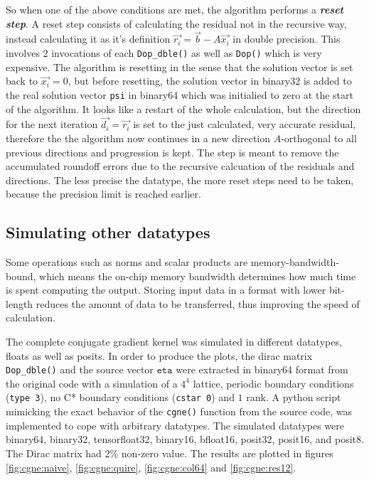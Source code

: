 \documentclass{article}
\theoremstyle{plain} %
\theoremstyle{remark} %
\def\code#1{\texttt{#1}}
\def\df#1{\textbf{\textit{#1}}}
\numberwithin{equation}{section}
\begin{document}
So when one of the above conditions are met, the algorithm performs a \df{reset step}. A reset step consists of calculating the residual not in the recursive way, instead calculating it as it's definition $\vec{r_i} = \vec{b} - A \vec{x_i}$ in double precision. This involves \num{2} invocations of each \code{Dop\_dble()} as well as \code{Dop()} which is very expensive. The algorithm is resetting in the sense that the solution vector is set back to $\vec{x_i} = 0$, but before resetting, the solution vector in \gls{binary32} is added to the real solution vector \code{psi} in \gls{binary64} which was initialied to zero at the start of the algorithm. It looks like a restart of the whole calculation, but the direction for the next iteration $\vec{d_i} = \vec{r_i}$ is set to the just calculated, very accurate residual, therefore the the algorithm now continues in a new direction $A$-orthogonal to all previous directions and progression is kept. The step is meant to remove the accumulated roundoff errors due to the recursive calcuation of the residuals and directions. The less precise the datatype, the more reset steps need to be taken, because the precision limit is reached earlier.

\subsection{Simulating other datatypes}

Some operations such as norms and scalar products are memory-bandwidth-bound, which means the on-chip memory bandwidth determines how much time is spent computing the output. Storing input data in a format with lower bit-length reduces the amount of data to be transferred, thus improving the speed of calculation.

The complete conjugate gradient kernel was simulated in different datatypes, floats as well as posits. In order to produce the plots, the dirac matrix \code{Dop\_dble()} and the source vector $\code{eta}$ were extracted in \gls{binary64} format from the original code with a simulation of a $4^4$ lattice, periodic boundary conditions (\code{type 3}), no C* boundary conditions (\code{cstar 0}) and $1$ rank. A python script mimicking the exact behavior of the \code{cgne()} function from the source code\footnotemark, was implemented to cope with arbitrary datatypes. The simulated datatypes were \gls{binary64}, \gls{binary32}, \gls{tensorfloat32}, \gls{binary16}, \gls{bfloat16}, \gls{posit32}, \gls{posit16}, and \gls{posit8}. The Dirac matrix had \num{2}\% non-zero value. The results are plotted in figures \ref{fig:cgne:naive}, \ref{fig:cgne:quire}, \ref{fig:cgne:col64} and \ref{fig:cgne:res12}.
\end{document}
